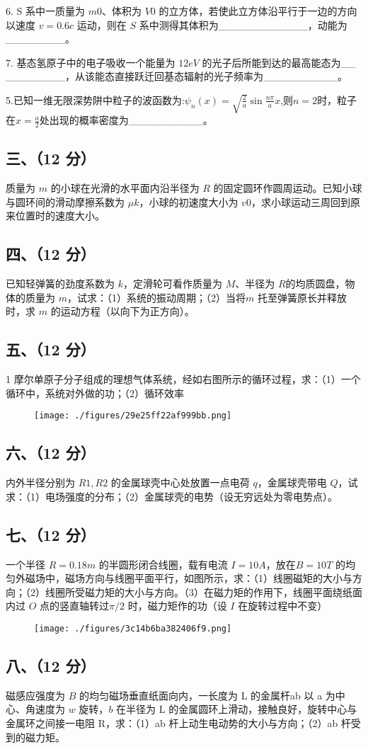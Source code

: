 6. S 系中一质量为 $m0$、体积为 $V0$ 的立方体，若使此立方体沿平行于一边的方向以速度 $v=0.6c$ 运动，则在 $S$ 系中测得其体积为____________，动能为________。

7. 基态氢原子中的电子吸收一个能量为 $12eV$ 的光子后所能到达的最高能态为__
________，从该能态直接跃迁回基态辐射的光子频率为__________。

5.已知一维无限深势阱中粒子的波函数为:$\psi_n(x)=\sqrt{\frac{2}{a}}\sin\frac{n\pi}{a}x$,则$n=2$时，粒子在$x=\frac{a}{2}$处出现的概率密度为__________。
\subsection{三、（12 分）}
质量为 $m$ 的小球在光滑的水平面内沿半径为 $R$ 的固定圆环作圆周运动。已知小球与圆环间的滑动摩擦系数为 $\mu k$，小球的初速度大小为 $v0$，求小球运动三周回到原来位置时的速度大小。
\subsection{四、（12 分）}
已知轻弹簧的劲度系数为 $k$，定滑轮可看作质量为 $M$、半径为 $R$的均质圆盘，物体的质量为 $m$，试求：（1）系统的振动周期；（2）当将$m$ 托至弹簧原长并释放时，求 $m$ 的运动方程（以向下为正方向）。
\subsection{五、（12 分）}
1 摩尔单原子分子组成的理想气体系统，经如右图所示的循环过程，求：（1）一个循环中，系统对外做的功；（2）循环效率
\begin{figure}[ht]
\centering
\texttt{[image: ./figures/29e25ff22af999bb.png]}
\caption{} \label{fig_NJU05_1}
\end{figure}
\subsection{六、（12 分）}
内外半径分别为 $R1,R2$ 的金属球壳中心处放置一点电荷 $q$，金属球壳带电 $Q$，试求：（1）电场强度的分布；（2）金属球壳的电势（设无穷远处为零电势点）。
\subsection{七、（12 分）}
一个半径 $R=0.18m$ 的半圆形闭合线圈，载有电流 $I=10A$，放在$B=10T$ 的均匀外磁场中，磁场方向与线圈平面平行，如图所示，求：（1）线圈磁矩的大小与方向；（2）线圈所受磁力矩的大小与方向。（3）在磁力矩的作用下，线圈平面绕纸面内过 $O$ 点的竖直轴转过$\pi/2$ 时，磁力矩作的功（设 $I$ 在旋转过程中不变）
\begin{figure}[ht]
\centering
\texttt{[image: ./figures/3c14b6ba382406f9.png]}
\caption{} \label{fig_NJU05_2}
\end{figure}
\subsection{八、（12 分）}
磁感应强度为 $B$ 的均匀磁场垂直纸面向内，一长度为 L 的金属杆ab 以 a 为中心、角速度为 $w$ 旋转，$b$ 在半径为 L 的金属圆环上滑动，接触良好，旋转中心与金属环之间接一电阻 R，求：（1）ab 杆上动生电动势的大小与方向；（2）ab 杆受到的磁力矩。